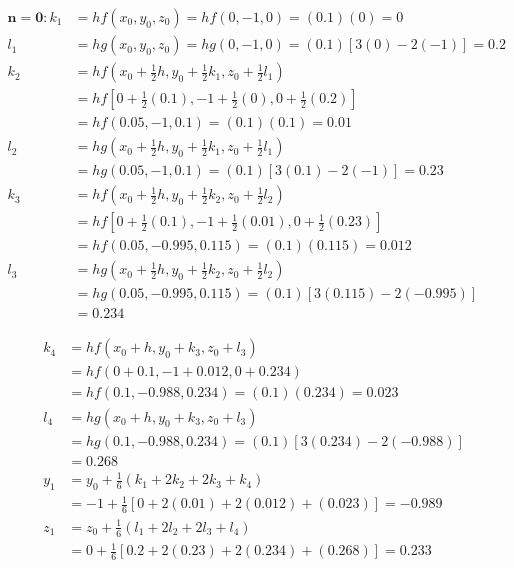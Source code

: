 \documentclass[10pt]{article}
\begin{document}
$$
\begin{aligned}
\boldsymbol{n}=\mathbf{0}: k_{1} & =h f\left(x_{0}, y_{0}, z_{0}\right)=h f(0,-1,0)=(0.1)(0)=0 \\
l_{1} & =h g\left(x_{0}, y_{0}, z_{0}\right)=h g(0,-1,0)=(0.1)[3(0)-2(-1)]=0.2 \\
k_{2} & =h f\left(x_{0}+\frac{1}{2} h, y_{0}+\frac{1}{2} k_{1}, z_{0}+\frac{1}{2} l_{1}\right) \\
& =h f\left[0+\frac{1}{2}(0.1),-1+\frac{1}{2}(0), 0+\frac{1}{2}(0.2)\right] \\
& =h f(0.05,-1,0.1)=(0.1)(0.1)=0.01 \\
l_{2} & =h g\left(x_{0}+\frac{1}{2} h, y_{0}+\frac{1}{2} k_{1}, z_{0}+\frac{1}{2} l_{1}\right) \\
& =h g(0.05,-1,0.1)=(0.1)[3(0.1)-2(-1)]=0.23 \\
k_{3} & =h f\left(x_{0}+\frac{1}{2} h, y_{0}+\frac{1}{2} k_{2}, z_{0}+\frac{1}{2} l_{2}\right) \\
& =h f\left[0+\frac{1}{2}(0.1),-1+\frac{1}{2}(0.01), 0+\frac{1}{2}(0.23)\right] \\
& =h f(0.05,-0.995,0.115)=(0.1)(0.115)=0.012 \\
l_{3} & =h g\left(x_{0}+\frac{1}{2} h, y_{0}+\frac{1}{2} k_{2}, z_{0}+\frac{1}{2} l_{2}\right) \\
& =h g(0.05,-0.995,0.115)=(0.1)[3(0.115)-2(-0.995)] \\
& =0.234
\end{aligned}
$$

$$
\begin{aligned}
k_{4} & =h f\left(x_{0}+h, y_{0}+k_{3}, z_{0}+l_{3}\right) \\
& =h f(0+0.1,-1+0.012,0+0.234) \\
& =h f(0.1,-0.988,0.234)=(0.1)(0.234)=0.023 \\
l_{4} & =h g\left(x_{0}+h, y_{0}+k_{3}, z_{0}+l_{3}\right) \\
& =h g(0.1,-0.988,0.234)=(0.1)[3(0.234)-2(-0.988)] \\
& =0.268 \\
y_{1} & =y_{0}+\frac{1}{6}\left(k_{1}+2 k_{2}+2 k_{3}+k_{4}\right) \\
& =-1+\frac{1}{6}[0+2(0.01)+2(0.012)+(0.023)]=-0.989 \\
z_{1} & =z_{0}+\frac{1}{6}\left(l_{1}+2 l_{2}+2 l_{3}+l_{4}\right) \\
& =0+\frac{1}{6}[0.2+2(0.23)+2(0.234)+(0.268)]=0.233
\end{aligned}
$$
\end{document}
